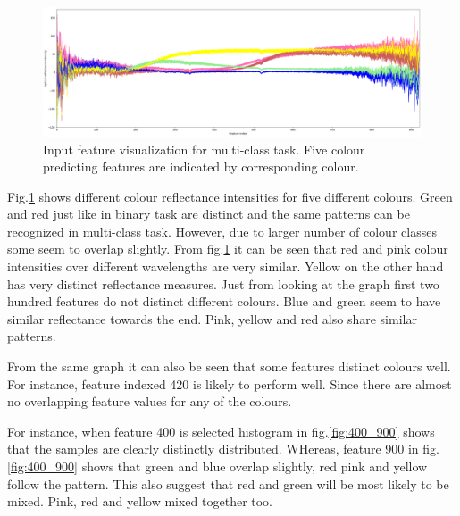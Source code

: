 \documentclass[11pt]{article}
\begin{document}
			\begin{figure}[H]
				\includegraphics[width=1\textwidth]{png/multi_default}
				\caption{Input feature visualization for multi-class task. Five colour predicting features are indicated by corresponding colour.}
				\label{fig:multi}
			\end{figure}

			Fig.\ref{fig:multi} shows different colour reflectance intensities for five different colours. Green and red just like in binary task are distinct and the same patterns can be recognized in multi-class task. However, due to larger number of colour classes some seem to overlap slightly. From fig.\ref{fig:multi} it can be seen that red and pink colour intensities over different wavelengths are very similar. Yellow on the other hand has very distinct reflectance measures. Just from looking at the graph first two hundred features do not distinct different colours. Blue and green seem to have similar reflectance towards the end. Pink, yellow and red also share similar patterns. 

			From the same graph it can also be seen that some features distinct colours well. For instance, feature indexed 420 is likely to perform well. Since there are almost no overlapping feature values for any of the colours. 

			For instance, when feature 400 is selected histogram in fig.\ref{fig:400_900} shows that the samples are clearly distinctly distributed. WHereas, feature 900 in fig.\ref{fig:400_900} shows that green and blue overlap slightly, red pink and yellow follow the pattern. This also suggest that red and green will be  most likely to be mixed. Pink, red and yellow mixed together too. 
\end{document}
